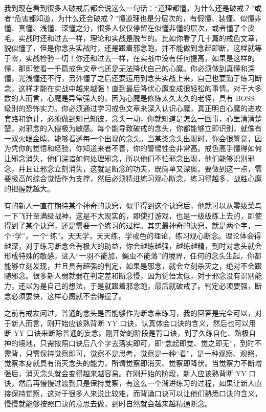 我到现在看到很多人破戒后都会说这么一句话：“道理都懂，为什么还是破戒？”或者“危害都知道，为什么还会破戒？”懂道理也是分层次的，有假懂、装懂、似懂非懂、真懂、浅懂、深懂之分，很多人仅仅停留在似懂非懂的层次，或者懂了个皮毛，实战时还和过去一样，理论和实战是脱节的。比如你看了几十篇的戒色文章，貌似懂了，但是你念头实战时，还是跟着邪念跑，并不能做到念起即断，这样就等于零，实战检验一切！你还和过去一样，在实战中没有任何提高，如果是这样的懂，那即使看一千篇戒色文章也还是无法降伏自己的心魔。你必须做到真懂和深懂，光浅懂还不行，另外懂了之后还要运用到念头实战上来，自己也要勤于练习断念，这样才能在实战中越来越强！直到最后降伏心魔变成很轻松的事情。对于大多数的人而言，心魔是异常强大的，因为心魔是修炼太久太久的老怪，具有 BOSS 级别的恐怖实力。你必须通过学习戒色文章来深入认识心魔，真正明白心魔的进攻套路和诡计，必须做到知己知彼，念头一动，你就知道是怎么一回事，心里清清楚楚，对邪念的入侵极为敏感。每个能导致破戒的念头，你都能够立即识别，就像有一双火眼金睛，能够看透每一个出现的念头。当某类念头出现时，你会很警觉，因为凭你的觉悟和经验，你知道来者不善，你的警惕性会非常高。戒色高手懂得如何让邪念消失，他们深谙如何处理邪念，所以他们不怕邪念出现，他们能够识别邪念，并且让邪念立刻消失，这就是断念的功夫，既简单又深奥。要做到这一点，需要极高的综合觉悟作为支撑，然后必须精进练习观心断念，练习得越多，战胜心魔的把握就越大。

有的新人一直在期待某个神奇的诀窍，似乎得到这个诀窍后，他就可以从零级菜鸟一下飞升至满级战神，这是不大现实的，即使打游戏，也是一级级练上去的，即使得到了某个诀窍，还是需要一个练习的过程。其实最神奇的诀窍，就是两个字，一个“学”，一个“练”。天天学，天天练，学戒色的理论，练习观心断念。理论体会得越深，对于练习断念会有极大的助益，你会越练越强，越练越精，到时对念头就会形成特殊的敏感，进入“一羽不能加，蝇虫不能落”的境界，任何的念头生起，你都能够立刻发现，并且具有超强的判定，如果是邪念，就会立刻杀灭之，绝对不会跟随邪念。很多新人弱就弱在判定差和断念慢，因为觉悟太低，对于邪念没有识别能力，还以为是自己的想法，于是就跟着邪念跑，最后就破戒了。判定必须要强，断念必须要快，这样心魔就不会得逞了。

之前有戒友问过，普通的念头是否能够作为断念来练习，我的回答是完全可以，对于新人而言，刚开始应该熟背断 YY 口诀，认真体会口诀的含义，然后也可以用断 YY 口诀来断除普通的妄念。刚开始的阶段是背口诀，到了久练自化、熟极自神的境地，只需按照口诀后八个字去落实即可，即“念起即觉、觉之即无”，到时不需背，只需保持觉察即可，觉察不是思考，觉察是一种“看”，是一种观察、观照，觉察本身就具有消灭念头的能力，所谓觉察即消灭、觉察即降伏。当觉察力不断增强后，消灭念头就会变得越来越容易。在刚开始的阶段，新人应该熟背断 YY 口诀，然后再慢慢过渡到只是保持觉察，有这么一个渐进练习的过程，如果让新人直接保持觉察，这对于很多人来说比较难，而背诵口诀可以让他们熟悉口诀的含义，慢慢就能够按照口诀的意思去做，到时自然就会越来越精通断念。

